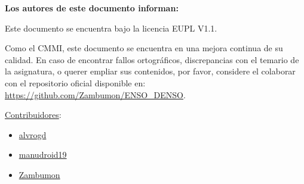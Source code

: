 \vspace*{\fill}
\begin{center}
    \textbf{Los autores de este documento informan:}\\
\end{center}
\vspace*{0.6em}
\begin{center}
    Este documento se encuentra bajo la licencia EUPL V1.1.\\
\end{center}
\begin{center}
    Como el CMMI, este documento se encuentra en una mejora continua de su calidad. En caso de encontrar
    fallos ortográficos, discrepancias con el temario de la asignatura, o querer empliar sus contenidos, por favor, considere el colaborar con el repositorio oficial disponible en:
    \url{https://github.com/Zambumon/ENSO_DENSO}.
\end{center}
\vspace*{0.6em}
\begin{center}
    \uline{Contribuidores}:\\
    \begin{itemize}
        \item[] \hspace{2.42in}\href{https://github.com/alvrogd}{alvrogd}
        \item[] \hspace{2.25in}\href{https://github.com/manudroid19}{manudroid19}
        \item[] \hspace{2.33in}\href{https://github.com/Zambumon}{Zambumon}
    \end{itemize}
\end{center}
\vspace*{\fill}